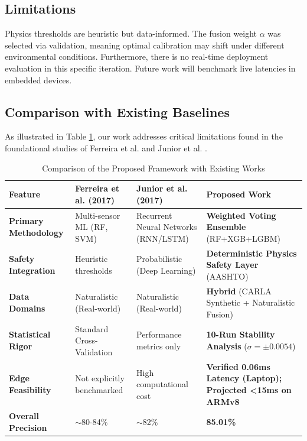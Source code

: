 \documentclass[pdflatex,sn-mathphys-num]{sn-jnl}
\theoremstyle{thmstyleone}
\theoremstyle{thmstyletwo}
\theoremstyle{thmstylethree}
\begin{document}
\FloatBarrier
\subsection{Limitations}
Physics thresholds are heuristic but data-informed. The fusion weight $\alpha$ was selected via validation, meaning optimal calibration may shift under different environmental conditions. Furthermore, there is no real-time deployment evaluation in this specific iteration. Future work will benchmark live latencies in embedded devices.

\FloatBarrier
\subsection{Comparison with Existing Baselines}
As illustrated in Table \ref{tab:state_of_the_art_comparison}, our work addresses critical limitations found in the foundational studies of Ferreira et al. \cite{ferreira2017} and Junior et al. \cite{junior2017}.

\begin{table}[!ht]
    \caption{Comparison of the Proposed Framework with Existing Works}
    \label{tab:state_of_the_art_comparison}
    \centering
    \small %
    \renewcommand{\arraystretch}{1.4} %
    \begin{tabularx}{\textwidth}{@{} l >{\raggedright\arraybackslash}X >{\raggedright\arraybackslash}X >{\raggedright\arraybackslash}X @{}}
        \toprule
        \textbf{Feature} & \textbf{Ferreira et al. (2017) \cite{ferreira2017}} & \textbf{Junior et al. (2017) \cite{junior2017}} & \textbf{Proposed Work} \\
        \midrule
        \textbf{Primary Methodology} & Multi-sensor ML (RF, SVM) & Recurrent Neural Networks (RNN/LSTM) & \textbf{Weighted Voting Ensemble} (RF+XGB+LGBM) \\
        \textbf{Safety Integration} & Heuristic thresholds & Probabilistic (Deep Learning) & \textbf{Deterministic Physics Safety Layer} (AASHTO) \\
        \textbf{Data Domains} & Naturalistic (Real-world) & Naturalistic (Real-world) & \textbf{Hybrid} (CARLA Synthetic + Naturalistic Fusion) \\
        \textbf{Statistical Rigor} & Standard Cross-Validation & Performance metrics only & \textbf{10-Run Stability Analysis} ($\sigma = \pm0.0054$) \\
        \textbf{Edge Feasibility} & Not explicitly benchmarked & High computational cost & \textbf{Verified 0.06ms Latency (Laptop); Projected <15ms on ARMv8} \\
        \textbf{Overall Precision} & $\sim$80-84\% & $\sim$82\% & \textbf{85.01\%} \\
        \bottomrule
    \end{tabularx}
\end{table}
\end{document}
